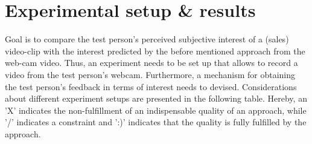 
\section{Experimental setup \& results}
Goal is to compare the test person's perceived subjective interest of a (sales) video-clip with the interest predicted by the before mentioned approach from the web-cam video. Thus, an experiment needs to be set up that allows to record a video from the test person's webcam. Furthermore, a mechanism for obtaining the test person's feedback in terms of interest needs to devised.
\newline\newline
Considerations about different experiment setups are presented in the following table. Hereby, an 'X' indicates the non-fulfillment of an indispensable quality of an approach, while '/' indicates a constraint and ':)' indicates that the quality is fully fulfilled by the approach.

